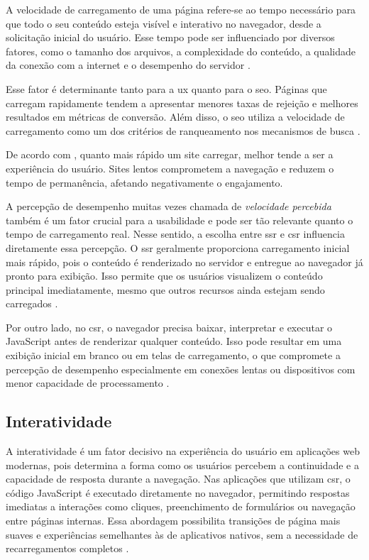 A velocidade de carregamento de uma página refere-se ao tempo necessário para que todo o seu conteúdo esteja visível e interativo no navegador, desde a solicitação inicial do usuário. Esse tempo pode ser influenciado por diversos fatores, como o tamanho dos arquivos, a complexidade do conteúdo, a qualidade da conexão com a internet e o desempenho do servidor \cite{shopify2024}.

Esse fator é determinante tanto para a \acrshort{ux} quanto para o \acrshort{seo}. Páginas que carregam rapidamente tendem a apresentar menores taxas de rejeição e melhores resultados em métricas de conversão. Além disso, o \acrshort{seo} utiliza a velocidade de carregamento como um dos critérios de ranqueamento nos mecanismos de busca \cite{conor2022}.

De acordo com , quanto mais rápido um site carregar, melhor tende a ser a experiência do usuário. Sites lentos comprometem a navegação e reduzem o tempo de permanência, afetando negativamente o engajamento.

A percepção de desempenho muitas vezes chamada de \emph{velocidade percebida} também é um fator crucial para a usabilidade e pode ser tão relevante quanto o tempo de carregamento real. Nesse sentido, a escolha entre \acrshort{ssr} e \acrshort{csr} influencia diretamente essa percepção. O \acrshort{ssr} geralmente proporciona carregamento inicial mais rápido, pois o conteúdo é renderizado no servidor e entregue ao navegador já pronto para exibição. Isso permite que os usuários visualizem o conteúdo principal imediatamente, mesmo que outros recursos ainda estejam sendo carregados \cite{atori2024}.

Por outro lado, no \acrshort{csr}, o navegador precisa baixar, interpretar e executar o JavaScript antes de renderizar qualquer conteúdo. Isso pode resultar em uma exibição inicial em branco ou em telas de carregamento, o que compromete a percepção de desempenho especialmente em conexões lentas ou dispositivos com menor capacidade de processamento \cite{pixelfree2023}.


\subsection{Interatividade}
\label{subsec:interatividade}

A interatividade é um fator decisivo na experiência do usuário em aplicações web modernas, pois determina a forma como os usuários percebem a continuidade e a capacidade de resposta durante a navegação. Nas aplicações que utilizam \acrshort{csr}, o código JavaScript é executado diretamente no navegador, permitindo respostas imediatas a interações como cliques, preenchimento de formulários ou navegação entre páginas internas. Essa abordagem possibilita transições de página mais suaves e experiências semelhantes às de aplicativos nativos, sem a necessidade de recarregamentos completos \cite{pixelfree2023}.

